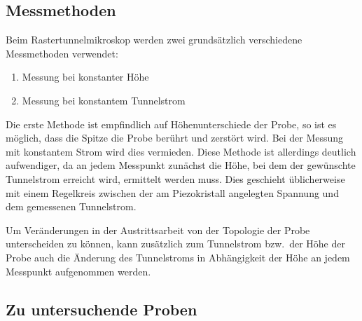 \subsection{Messmethoden}

Beim Rastertunnelmikroskop werden zwei grundsätzlich verschiedene Messmethoden verwendet:
\begin{enumerate}
  \item Messung bei konstanter Höhe
  \item Messung bei konstantem Tunnelstrom
\end{enumerate}

Die erste Methode ist empfindlich auf Höhenunterschiede der Probe, so ist es möglich, dass die Spitze die Probe berührt und zerstört wird.
Bei der Messung mit konstantem Strom wird dies vermieden.
Diese Methode ist allerdings deutlich aufwendiger, da an jedem Messpunkt zunächst die Höhe, bei dem der gewünschte Tunnelstrom erreicht wird, ermittelt werden muss.
Dies geschieht üblicherweise mit einem Regelkreis zwischen der am Piezokristall angelegten Spannung und dem gemessenen Tunnelstrom.

Um Veränderungen in der Austrittsarbeit von der Topologie der Probe unterscheiden zu können, kann zusätzlich zum Tunnelstrom bzw.\ der Höhe der Probe auch die Änderung des Tunnelstroms in Abhängigkeit der Höhe an jedem Messpunkt aufgenommen werden.

\subsection{Zu untersuchende Proben}

